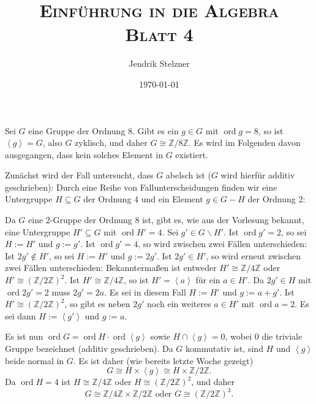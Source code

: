 \documentclass[a4paper,10pt]{article}
\title{\textsc{Einführung in die Algebra \\ \Large Blatt 4}}
\author{Jendrik Stelzner}
\date{\today}
\theoremstyle{definition}
\newcommand{\Z}{\mathbb{Z}}
\newcommand{\ord}{\operatorname{ord}}
\newcommand{\gen}[1]{\left\langle#1\right\rangle}
\begin{document}
\maketitle





\section{}
Sei $G$ eine Gruppe der Ordnung $8$. Gibt es ein $g \in G$ mit $\ord g = 8$, so ist $\gen{g} = G$, also $G$ zyklisch, und daher $G \cong \Z/8\Z$. Es wird im Folgenden davon ausgegangen, dass kein solches Element in $G$ existiert.

Zunächst wird der Fall untersucht, dass $G$ abelsch ist ($G$ wird hierfür additiv geschrieben): Durch eine Reihe von Fallunterscheidungen finden wir eine Untergruppe $H \subseteq G$ der Ordnung $4$ und ein Element $g \in G-H$ der Ordnung 2:

Da $G$ eine $2$-Gruppe der Ordnung $8$ ist, gibt es, wie aus der Vorlesung bekannt, eine Untergruppe $H' \subseteq G$ mit $\ord H' = 4$. Sei $g' \in G \smallsetminus H'$. Ist $\ord g' = 2$, so sei $H := H'$ und $g := g'$.
Ist $\ord g' = 4$, so wird zwischen zwei Fällen unterschieden: Ist $2g' \not\in H'$, so sei $H := H'$ und $g := 2g'$. Ist $2g' \in H'$, so wird erneut zwischen zwei Fällen unterschieden: Bekanntermaßen ist entweder $H' \cong \Z/4\Z$ oder $H' \cong (\Z/2\Z)^2$. Ist $H' \cong \Z/4\Z$, so ist $H' = \gen{a}$ für ein $a \in H'$. Da $2g' \in H$ mit $\ord 2g' = 2$ muss $2g' = 2a$. Es sei in diesem Fall $H := H'$ und $g := a+g'$. Ist $H' \cong (\Z/2\Z)^2$, so gibt es neben $2g'$ noch ein weiteres $a \in H'$ mit $\ord a = 2$. Es sei dann $H := \gen{g'}$ und $g := a$.

Es ist nun $\ord G = \ord H \cdot \ord \gen{g}$ sowie $H \cap \gen{g} = 0$, wobei $0$ die triviale Gruppe bezeichnet (additiv geschrieben). Da $G$ kommutativ ist, sind $H$ und $\gen{g}$ beide normal in $G$. Es ist daher (wie bereits letzte Woche gezeigt)
\[
 G \cong H \times \gen{g} \cong H \times \Z/2\Z.
\]
Da $\ord H = 4$ ist $H \cong \Z/4\Z$ oder $H \cong (\Z/2\Z)^2$, und daher
\[
 G \cong \Z/4\Z \times \Z/2\Z \text{ oder } G \cong (\Z/2\Z)^3.
\]
\end{document}

